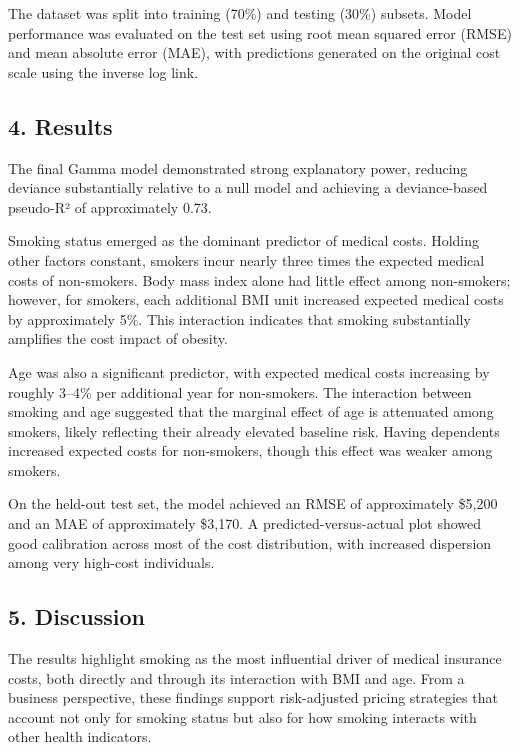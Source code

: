 \documentclass[
  letterpaper,
  DIV=11,
  numbers=noendperiod]{scrartcl}
\begin{document}
The dataset was split into training (70\%) and testing (30\%) subsets.
Model performance was evaluated on the test set using root mean squared
error (RMSE) and mean absolute error (MAE), with predictions generated
on the original cost scale using the inverse log link.

\subsection{\texorpdfstring{\textbf{4.
Results}}{4. Results}}\label{results}

The final Gamma model demonstrated strong explanatory power, reducing
deviance substantially relative to a null model and achieving a
deviance-based pseudo-R² of approximately 0.73.

Smoking status emerged as the dominant predictor of medical costs.
Holding other factors constant, smokers incur nearly three times the
expected medical costs of non-smokers. Body mass index alone had little
effect among non-smokers; however, for smokers, each additional BMI unit
increased expected medical costs by approximately 5\%. This interaction
indicates that smoking substantially amplifies the cost impact of
obesity.

Age was also a significant predictor, with expected medical costs
increasing by roughly 3--4\% per additional year for non-smokers. The
interaction between smoking and age suggested that the marginal effect
of age is attenuated among smokers, likely reflecting their already
elevated baseline risk. Having dependents increased expected costs for
non-smokers, though this effect was weaker among smokers.

On the held-out test set, the model achieved an RMSE of approximately
\$5,200 and an MAE of approximately \$3,170. A predicted-versus-actual
plot showed good calibration across most of the cost distribution, with
increased dispersion among very high-cost individuals.

\subsection{\texorpdfstring{\textbf{5.
Discussion}}{5. Discussion}}\label{discussion}

The results highlight smoking as the most influential driver of medical
insurance costs, both directly and through its interaction with BMI and
age. From a business perspective, these findings support risk-adjusted
pricing strategies that account not only for smoking status but also for
how smoking interacts with other health indicators.
\end{document}
